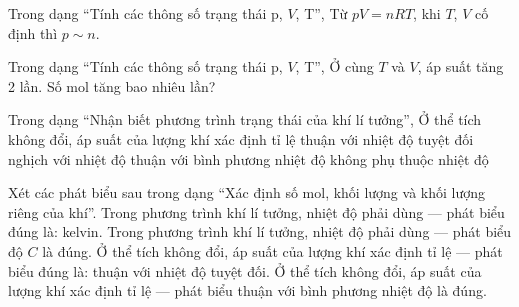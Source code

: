 \begin{ex}
Trong dạng “Tính các thông số trạng thái p, $V$, T”, Từ $pV=nRT$, khi $T$, $V$ cố định thì $p\sim n$.
\choiceTF

\end{ex}

\begin{ex}
Trong dạng “Tính các thông số trạng thái p, $V$, T”, Ở cùng $T$ và $V$, áp suất tăng 2 lần. Số mol tăng bao nhiêu lần?
\end{ex}

\begin{ex}
Trong dạng “Nhận biết phương trình trạng thái của khí lí tưởng”, Ở thể tích không đổi, áp suất của lượng khí xác định tỉ lệ
\choice
{\True thuận với nhiệt độ tuyệt đối}
{nghịch với nhiệt độ}
{thuận với bình phương nhiệt độ}
{không phụ thuộc nhiệt độ}
\end{ex}

\begin{ex}
Xét các phát biểu sau trong dạng “Xác định số mol, khối lượng và khối lượng riêng của khí”.
\choiceTF
{\True Trong phương trình khí lí tưởng, nhiệt độ phải dùng — phát biểu đúng là: kelvin.}
{Trong phương trình khí lí tưởng, nhiệt độ phải dùng — phát biểu độ $C$ là đúng.}
{\True Ở thể tích không đổi, áp suất của lượng khí xác định tỉ lệ — phát biểu đúng là: thuận với nhiệt độ tuyệt đối.}
{Ở thể tích không đổi, áp suất của lượng khí xác định tỉ lệ — phát biểu thuận với bình phương nhiệt độ là đúng.}
\end{ex}

